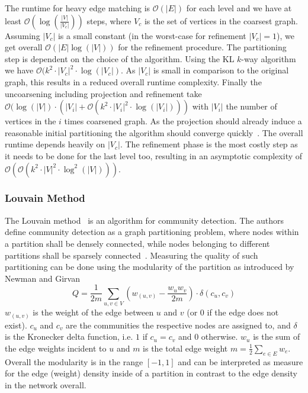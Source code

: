                 The runtime for heavy edge matching is $\mathcal{O}(|E|)$ for each level and we have at least $\mathcal{O}(\log(\frac{|V|}{|V_c|}))$ steps, where $V_c$ is the set of vertices in the coarsest graph. 
                Assuming $|V_c|$ is a small constant (in the worst-case for refinement $|V_c| = 1$), we get overall $\mathcal{O}(|E| \log(|V|))$ for the refinement procedure.
                The partitioning step is dependent on the choice of the algorithm.
                Using the KL $k$-way algorithm we have  $\mathcal{O}(k^2 \cdot |V_c|^2 \cdot \log(|V_c|)$. As $|V_c|$ is small in comparison to the original graph, this results in a reduced overall runtime complexity.
                Finally the uncoarsening including projection and refinement take $\mathcal{O}(\log(|V|) \cdot (|V_i| + \mathcal{O}(k^2 \cdot |V_i|^2 \cdot \log(|V_i|)))$ with $|V_i|$ the number of vertices in the $i$ times coarsened graph.  
                As the projection should already induce a reasonable initial partitioning the algorithm should converge quickly~\autocite{hendrickson1995multi}.
                The overall runtime depends heavily on $|V_c|$. 
                The refinement phase is the most costly step as it needs to be done for the last level too, resulting in an asymptotic complexity of $\mathcal{O}(\mathcal{O}(k^2 \cdot |V|^2 \cdot \log^2(|V|)))$.
                
            \subsubsection*{Louvain Method}\label{louvain-desc}
                The Louvain method~\autocite{blondel2008fast} is an algorithm for community detection. 
                The authors define community detection as a graph partitioning problem, where nodes within a partition shall be densely connected, while nodes belonging to different partitions shall be sparsely connected~\autocite{blondel2008fast}.
                Measuring the quality of such partitioning can be done using the modularity of the partition as introduced by Newman and Girvan~\autocite{girvan2002community}
                \[ Q = \frac{1}{2m} \sum_{u,v \in V} \left( w_{(u, v)} - \frac{w_u w_v}{2m} \right) \cdot \delta (c_u, c_v) \]
                $w_{(u,v)}$ is the weight of the edge between $u$ and $v$ (or $0$ if the edge does not exist). 
                $c_u$ and $c_v$ are the communities the respective nodes are assigned to, and $\delta$ is the Kronecker delta function, i.e. $1$ if $c_u = c_v$ and $0$ otherwise. 
                $w_u$ is the sum of the edge weights incident to $u$ and $m$ is the total edge weight $m = \frac{1}{2} \sum_{e \in E} w_e$.
                Overall the modularity is in the range $[-1, 1]$ and can be interpreted as measure for the edge (weight) density inside of a partition in contrast to the edge density in the network overall.
                
